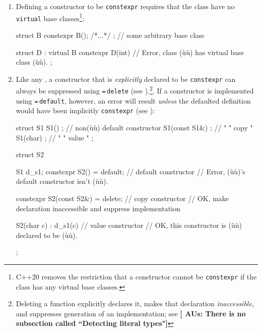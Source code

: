 \begin{enumerate}
\item{Defining a constructor to be \lstinline!constexpr! requires that the class have no \lstinline!virtual! base classes\cprotect\footnote{C++20 removes the restriction that a constructor cannot be \lstinline!constexpr! if the class has any virtual base classes.}:

\begin{emcppslisting} %
struct B { constexpr B();  /*...*/ };  // some arbitrary base class

struct D : virtual B
{
    constexpr D(int) { }   // Error, class (ù{}ù) has virtual base class (ù{}ù).
};
\end{emcppslisting}
}    

\item{Like any , a constructor that is \emph{explicitly} declared to be \lstinline!constexpr! can always be suppressed using \lstinline!=!\,\lstinline!delete! (see ).\cprotect\footnote{Deleting a function explicitly declares it, makes that declaration \emph{inaccessible}, and suppresses generation of an implementation; see \intrarefsimple{}\textbf{[ AUs: There is no subsection called ``Detecting literal types"]}}. If a constructor is implemented using \lstinline!=!\,\lstinline!default!, however, an error will result \emph{unless} the defaulted definition would have been implicitly \lstinline!constexpr! (see ):

\begin{emcppslisting} %
struct S1
{
    S1() { };           // non(ù{}ù) default constructor
    S1(const S1&) { };  //  "      "      copy         "
    S1(char) { };       //  "      "      value        "
};

struct S2
{
    S1 d_s1;
    constexpr S2() = default;          // default constructor
        // Error, (ù{}ù)'s default constructor isn't (ù{}ù).

    constexpr S2(const S2&) = delete;  // copy constructor
        // OK, make declaration inaccessible and suppress implementation

    S2(char c) : d_s1(c) { }           // value constructor
       // OK, this constructor is (ù{}ù) declared to be (ù{}ù).
};
\end{emcppslisting}
    

}
\end{enumerate}

